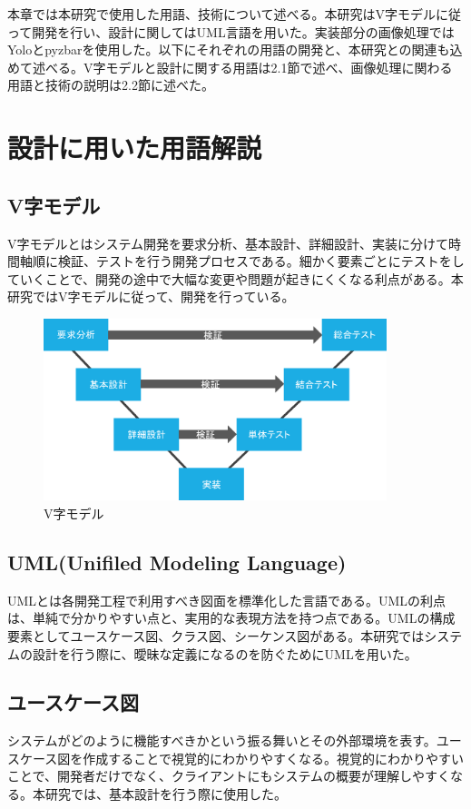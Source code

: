 本章では本研究で使用した用語、技術について述べる。本研究はV字モデルに従って開発を行い、設計に関してはUML言語を用いた。実装部分の画像処理ではYoloとpyzbarを使用した。以下にそれぞれの用語の開発と、本研究との関連も込めて述べる。V字モデルと設計に関する用語は2.1節で述べ、画像処理に関わる用語と技術の説明は2.2節に述べた。

\section{設計に用いた用語解説}

\subsection*{V字モデル}
V字モデルとはシステム開発を要求分析、基本設計、詳細設計、実装に分けて時間軸順に検証、テストを行う開発プロセスである。細かく要素ごとにテストをしていくことで、開発の途中で大幅な変更や問題が起きにくくなる利点がある。本研究ではV字モデルに従って、開発を行っている。

\begin{figure}[htbp]
\centering
\includegraphics[width=10cm]{./pic/vjimodel.eps}
\caption{V字モデル}
\label{v_model}
\end{figure}

\subsection*{UML(Unifiled Modeling Language)}
UMLとは各開発工程で利用すべき図面を標準化した言語である。UMLの利点は、単純で分かりやすい点と、実用的な表現方法を持つ点である。UMLの構成要素としてユースケース図、クラス図、シーケンス図がある\cite{uml}。本研究ではシステムの設計を行う際に、曖昧な定義になるのを防ぐためにUMLを用いた。

\subsection*{ユースケース図}
システムがどのように機能すべきかという振る舞いとその外部環境を表す。ユースケース図を作成することで視覚的にわかりやすくなる。視覚的にわかりやすいことで、開発者だけでなく、クライアントにもシステムの概要が理解しやすくなる。本研究では、基本設計を行う際に使用した。


